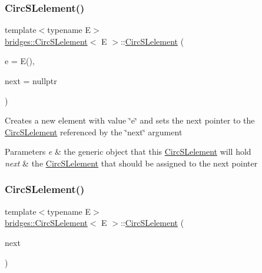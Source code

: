 \subsubsection{\texorpdfstring{Circ\+S\+Lelement()}{CircSLelement()}\hspace{0.1cm}{\footnotesize\ttfamily [3/4]}}
{\footnotesize\ttfamily template$<$typename E$>$ \\
\mbox{\hyperlink{classbridges_1_1_circ_s_lelement}{bridges\+::\+Circ\+S\+Lelement}}$<$ E $>$\+::\mbox{\hyperlink{classbridges_1_1_circ_s_lelement}{Circ\+S\+Lelement}} (\begin{DoxyParamCaption}\item[{E}]{e = {\ttfamily E()},  }\item[{\mbox{\hyperlink{classbridges_1_1_circ_s_lelement}{Circ\+S\+Lelement}}$<$ E $>$ $\ast$}]{next = {\ttfamily nullptr} }\end{DoxyParamCaption})\hspace{0.3cm}{\ttfamily [inline]}}

Creates a new element with value \char`\"{}e\char`\"{} and sets the next pointer to the \mbox{\hyperlink{classbridges_1_1_circ_s_lelement}{Circ\+S\+Lelement}} referenced by the \char`\"{}next\char`\"{} argument


\begin{DoxyParams}{Parameters}
{\em e} & the generic object that this \mbox{\hyperlink{classbridges_1_1_circ_s_lelement}{Circ\+S\+Lelement}} will hold \\
\hline
{\em next} & the \mbox{\hyperlink{classbridges_1_1_circ_s_lelement}{Circ\+S\+Lelement}} that should be assigned to the next pointer \\
\hline
\end{DoxyParams}
\mbox{\label{classbridges_1_1_circ_s_lelement_a1fda146fc0da1d8c7d6440cbbbb2ce42}} 
\subsubsection{\texorpdfstring{Circ\+S\+Lelement()}{CircSLelement()}\hspace{0.1cm}{\footnotesize\ttfamily [4/4]}}
{\footnotesize\ttfamily template$<$typename E$>$ \\
\mbox{\hyperlink{classbridges_1_1_circ_s_lelement}{bridges\+::\+Circ\+S\+Lelement}}$<$ E $>$\+::\mbox{\hyperlink{classbridges_1_1_circ_s_lelement}{Circ\+S\+Lelement}} (\begin{DoxyParamCaption}\item[{\mbox{\hyperlink{classbridges_1_1_circ_s_lelement}{Circ\+S\+Lelement}}$<$ E $>$ $\ast$}]{next }\end{DoxyParamCaption})\hspace{0.3cm}{\ttfamily [inline]}}

